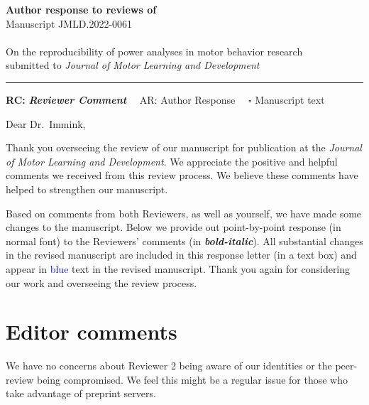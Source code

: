 \documentclass[final]{article}
\begin{document}
{\Large\bf Author response to reviews of}\\[1em]
Manuscript JMLD.2022-0061\\ \\
{\Large On the reproducibility of power analyses in motor behavior research}\\[1em]

{submitted to \it Journal of Motor Learning and Development }\\
\hrule

\hfill {\bfseries RC:} \textbf{\textit{Reviewer Comment}}\(\quad\) AR: Author Response \(\quad\square\) Manuscript text

\vspace{2em}

Dear Dr.~Immink,

Thank you overseeing the review of our manuscript for publication at the \emph{Journal of Motor Learning and Development}. We appreciate the positive and helpful comments we received from this review process. We believe these comments have helped to strengthen our manuscript.

Based on comments from both Reviewers, as well as yourself, we have made some changes to the manuscript. Below we provide out point-by-point response (in normal font) to the Reviewers' comments (in \textbf{\emph{bold-italic}}). All substantial changes in the revised manuscript are included in this response letter (in a text box) and appear in \textcolor{blue}{blue} text in the revised manuscript. Thank you again for considering our work and overseeing the review process.

\hypertarget{editor-comments}{%
\section{Editor comments}\label{editor-comments}}


We have no concerns about Reviewer 2 being aware of our identities or the peer-review being compromised. We feel this might be a regular issue for those who take advantage of preprint servers.
\end{document}
